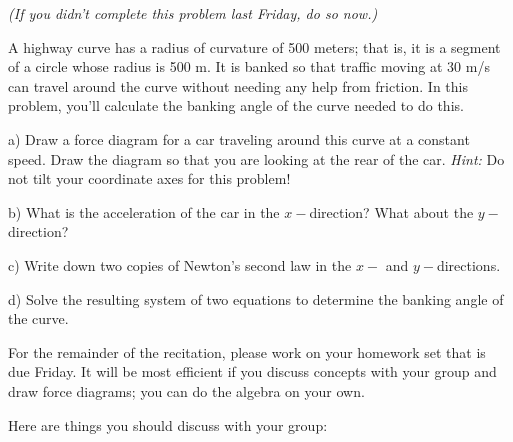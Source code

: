 \documentclass[12pt]{article}
\begin{document}
\Large
\centerline{}
\normalsize
\centerline{}


\it (If you didn't complete this problem last Friday, do so now.) \rm 

A highway curve has a radius of curvature of 500 meters; that is, it is a segment of a circle whose radius is 500 m. It is banked so that traffic moving at 30 m/s can travel
around the curve without needing any help from friction. In this problem, you'll calculate the banking angle of the curve needed to do this.

\bigskip



\begin{minipage}{0.5\textwidth}
a) Draw a force diagram for a car traveling around this curve at a constant speed. Draw the diagram so that you are looking at the rear of the car. {\it Hint:} Do not tilt your coordinate axes for this problem!
\end{minipage}
\hspace{0.1\textwidth}
\begin{minipage}{0.4\textwidth}
b) What is the acceleration of the car in the $x-$direction? What about the $y-$direction?
\end{minipage}
\vspace{2.5in}


\begin{minipage}{0.5\textwidth}
c) Write down two copies of Newton's second law in the $x-$ and $y-$directions.
\end{minipage}
\begin{minipage}{0.5\textwidth}
d) Solve the resulting system of two equations to determine the banking angle of the curve.
\end{minipage}

\newpage\rm

For the remainder of the recitation, please work on your homework set that is due Friday. It will be most efficient if you discuss concepts with your group and draw force diagrams; you can do the algebra on your own.

Here are things you should discuss with your group:
\end{document}
